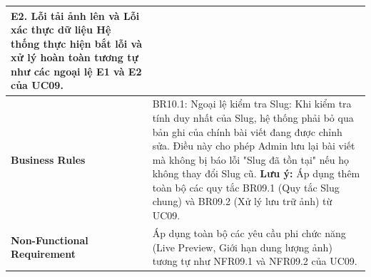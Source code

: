 \documentclass[a4paper,12pt]{article}
\begin{document}
\begin{longtable}{|p{4cm}|p{11.5cm}|}
\textbf{E2. Lỗi tải ảnh lên và Lỗi xác thực dữ liệu} \newline
Hệ thống thực hiện bắt lỗi và xử lý \textbf{hoàn toàn tương tự như các ngoại lệ E1 và E2 của UC09}. \\ \hline
\textbf{Business Rules} & 
BR10.1: Ngoại lệ kiểm tra Slug: Khi kiểm tra tính duy nhất của Slug, hệ thống phải bỏ qua bản ghi của chính bài viết đang được chỉnh sửa. Điều này cho phép Admin lưu lại bài viết mà không bị báo lỗi "Slug đã tồn tại" nếu họ không thay đổi Slug cũ. \newline
\textbf{Lưu ý:} Áp dụng thêm toàn bộ các quy tắc BR09.1 (Quy tắc Slug chung) và BR09.2 (Xử lý lưu trữ ảnh) từ UC09. \\ \hline
\textbf{Non-Functional Requirement} & 
Áp dụng toàn bộ các yêu cầu phi chức năng (Live Preview, Giới hạn dung lượng ảnh) tương tự như NFR09.1 và NFR09.2 của UC09. \\ \hline
\end{longtable}
\end{document}
